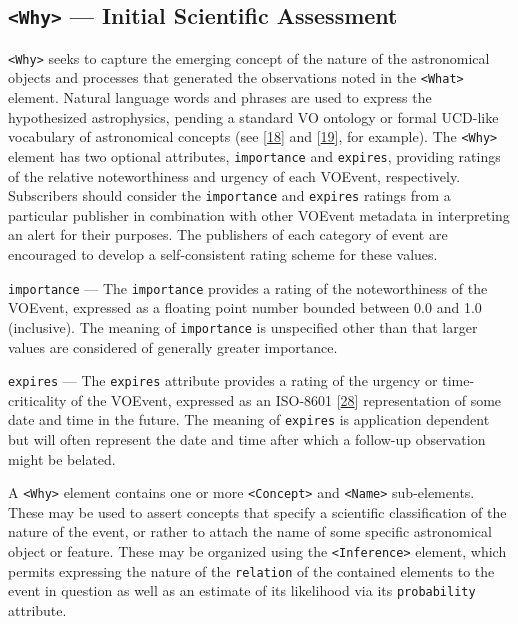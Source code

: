 \documentclass[11pt,a4paper]{ivoa}
\begin{document}
\subsection{{\tt <Why>} --- Initial Scientific Assessment}
\label{sec:3.6}
{\tt <Why>} seeks to capture the emerging concept of the nature of the astronomical objects and processes that generated the observations noted in the {\tt <What>} element. Natural language words and phrases are used to express the hypothesized astrophysics, pending a standard VO ontology or formal UCD-like vocabulary of astronomical concepts (see [\hyperref[bib18]{18}]
and [\hyperref[bib19]{19}], for example). The {\tt <Why>} element has two optional attributes, {\tt importance} and {\tt expires}, providing ratings of the relative noteworthiness and urgency of each VOEvent, respectively. Subscribers should consider the {\tt importance} and {\tt expires} ratings from a particular publisher in combination with other VOEvent metadata in interpreting an alert for their purposes. The publishers of each category of event are encouraged to develop a self-consistent rating scheme for these values. 

 {\tt importance}\label{sec:3.6.1} ---
The {\tt importance} provides a rating of the noteworthiness of the VOEvent, expressed as a floating point number bounded between 0.0 and 1.0 (inclusive). The meaning of {\tt importance} is unspecified other than that larger values are considered of generally greater importance. 

 {\tt expires}\label{sec:3.6.2} --- 
The {\tt expires} attribute provides a rating of the urgency or time-criticality of the VOEvent, expressed as an ISO-8601 [\hyperref[bib28]{28}] representation of some date and time in the future. The meaning of {\tt expires} is application dependent but will often represent the date and time after which a follow-up observation might be belated. 

A {\tt <Why>} element contains one or more {\tt <Concept>} and {\tt <Name>} sub-elements. These may be used to assert concepts that specify a scientific classification of the nature of the event, or rather to attach the name of some specific astronomical object or feature. These may be organized using the {\tt <Inference>} element, which permits expressing the nature of the {\tt relation} of the contained elements to the event in question as well as an estimate of its likelihood via its {\tt probability} attribute. 

\setcounter{subsubsection}{2} 
\end{document}

